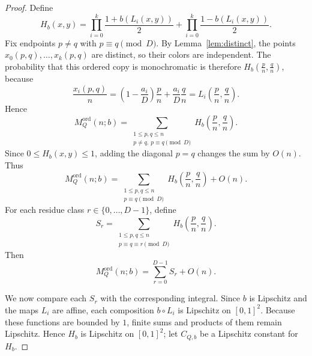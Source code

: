 \documentclass[twoside,12pt]{article}
\newcommand{\ord}{\mathrm{ord}}
\newcommand{\Mord}{M^{\ord}}
\newcommand{\1}{\mathbf 1}
\begin{document}
\begin{proof}
Define
\[
H_b(x,y)=
\prod_{i=0}^k\frac{1+b(L_i(x,y))}{2}
+
\prod_{i=0}^k\frac{1-b(L_i(x,y))}{2}.
\]
Fix endpoints \(p\ne q\) with \(p\equiv q\pmod D\).  By
Lemma~\ref{lem:distinct}, the points \(x_0(p,q),\dots,x_k(p,q)\) are
distinct, so their colors are independent.  The probability that this ordered
copy is monochromatic is therefore
$H_b\!\left(\frac pn,\frac qn\right)$,
because
\[
\frac{x_i(p,q)}{n}
=
\left(1-\frac{a_i}{D}\right)\frac pn+\frac{a_i}{D}\frac qn
=
L_i\!\left(\frac pn,\frac qn\right).
\]
Hence
\[
\Mord_Q(n;b)=
\sum_{\substack{1\le p,q\le n\\ p\ne q,\ p\equiv q\pmod D}}
H_b\!\left(\frac pn,\frac qn\right).
\]
Since \(0\le H_b(x,y)\le1\), adding the diagonal \(p=q\) changes the sum by
\(O(n)\).  Thus
\[
\Mord_Q(n;b)=
\sum_{\substack{1\le p,q\le n\\ p\equiv q\pmod D}}
H_b\!\left(\frac pn,\frac qn\right)+O(n).
\]
For each residue class \(r\in\{0,\dots,D-1\}\), define
\[
S_r=
\sum_{\substack{1\le p,q\le n\\ p\equiv q\equiv r\pmod D}}
H_b\!\left(\frac pn,\frac qn\right).
\]
Then
\begin{equation}\label{eq:Sr-sum}
\Mord_Q(n;b)=\sum_{r=0}^{D-1}S_r+O(n).
\end{equation}

We now compare each \(S_r\) with the corresponding integral.  Since \(b\) is
Lipschitz and the maps \(L_i\) are affine, each composition \(b\circ L_i\) is
Lipschitz on \([0,1]^2\).  Because these functions are bounded by \(1\),
finite sums and products of them remain Lipschitz.  Hence \(H_b\) is
Lipschitz on \([0,1]^2\); let \(C_{Q,b}\) be a Lipschitz constant for
\(H_b\).


\end{proof}
\end{document}
